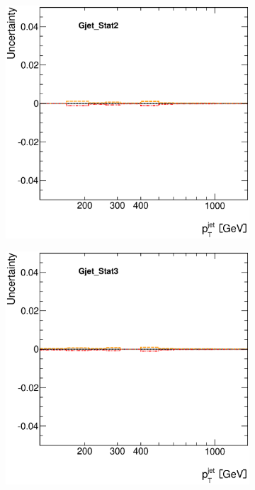 \documentclass[12pt, twoside]{article}
\numberwithin{equation}{section}
\numberwithin{figure}{section}
\newenvironment{changemargin}[2]{%
\begin{list}{}{%
\setlength{\topsep}{0pt}%
\setlength{\leftmargin}{#1}%
\setlength{\rightmargin}{#2}%
\setlength{\listparindent}{\parindent}%
\setlength{\itemindent}{\parindent}%
\setlength{\parsep}{\parskip}%
}%
\item[]}{\end{list}}
\begin{document}
\begin{figure}[H]
\begin{changemargin}{-1.0cm}{-0.75cm}
\begin{changemargin}{-0.75cm}{-1.0cm}
\begin{subfigure}[b]{0.25\textwidth}
        \end{subfigure}
        \begin{subfigure}[b]{0.25\textwidth}
            \includegraphics[width=\textwidth]{./images/JetSystematics/JetSystematic-11.eps}
        \end{subfigure}
        \begin{subfigure}[b]{0.25\textwidth}
            \includegraphics[width=\textwidth]{./images/JetSystematics/JetSystematic-12.eps}
        \end{subfigure}


\end{changemargin}
\end{changemargin}
\end{figure}
\end{document}
